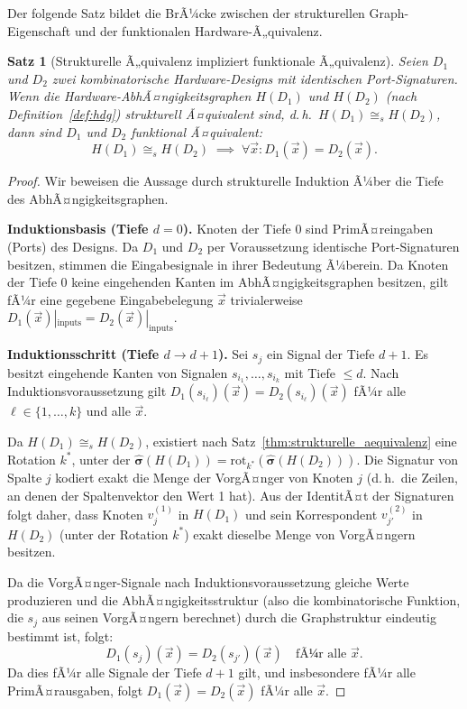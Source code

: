 ﻿\documentclass[12pt,a4paper]{report}
\newtheorem{theorem}{Satz}[section]
\begin{document}
Der folgende Satz bildet die BrÃ¼cke zwischen der strukturellen Graph-Eigenschaft und der funktionalen Hardware-Ã„quivalenz.

\begin{theorem}[Strukturelle Ã„quivalenz impliziert funktionale Ã„quivalenz]
\label{thm:struktur_impliziert_funktion}
Seien $D_1$ und $D_2$ zwei kombinatorische Hardware-Designs mit identischen Port-Signaturen. Wenn die Hardware-AbhÃ¤ngigkeitsgraphen $H(D_1)$ und $H(D_2)$ (nach Definition~\ref{def:hdg}) strukturell Ã¤qui\-valent sind, d.\,h.\ $H(D_1) \cong_s H(D_2)$, dann sind $D_1$ und $D_2$ funktional Ã¤quivalent:
\[
H(D_1) \cong_s H(D_2) \;\implies\; \forall \vec{x} : D_1(\vec{x}) = D_2(\vec{x}).
\]
\end{theorem}

\begin{proof}
Wir beweisen die Aussage durch strukturelle Induktion Ã¼ber die Tiefe des AbhÃ¤ngigkeitsgraphen.

\textbf{Induktionsbasis (Tiefe $d = 0$).}
Knoten der Tiefe 0 sind PrimÃ¤reingaben (Ports) des Designs. Da $D_1$ und $D_2$ per Voraussetzung identische Port-Signaturen besitzen, stimmen die Eingabesignale in ihrer Bedeutung Ã¼berein. Da Knoten der Tiefe 0 keine eingehenden Kanten im AbhÃ¤ngigkeitsgraphen besitzen, gilt fÃ¼r eine gegebene Eingabebelegung $\vec{x}$ trivialerweise $D_1(\vec{x})|_{\mathrm{inputs}} = D_2(\vec{x})|_{\mathrm{inputs}}$.

\textbf{Induktionsschritt (Tiefe $d \to d+1$).}
Sei $s_j$ ein Signal der Tiefe $d+1$. Es besitzt eingehende Kanten von Signalen $s_{i_1}, \ldots, s_{i_k}$ mit Tiefe $\leq d$. Nach Induktionsvoraussetzung gilt $D_1(s_{i_\ell})(\vec{x}) = D_2(s_{i_\ell})(\vec{x})$ fÃ¼r alle $\ell \in \{1,\ldots,k\}$ und alle $\vec{x}$.

Da $H(D_1) \cong_s H(D_2)$, existiert nach Satz~\ref{thm:strukturelle_aequivalenz} eine Rotation $k^*$, unter der $\hat{\boldsymbol{\sigma}}(H(D_1)) = \mathrm{rot}_{k^*}(\hat{\boldsymbol{\sigma}}(H(D_2)))$. Die Signatur von Spalte $j$ kodiert exakt die Menge der VorgÃ¤nger von Knoten $j$ (d.\,h.\ die Zeilen, an denen der Spaltenvektor den Wert 1 hat). Aus der IdentitÃ¤t der Signaturen folgt daher, dass Knoten $v_j^{(1)}$ in $H(D_1)$ und sein Korrespondent $v_{j'}^{(2)}$ in $H(D_2)$ (unter der Rotation $k^*$) exakt dieselbe Menge von VorgÃ¤ngern besitzen.

Da die VorgÃ¤nger-Signale nach Induktionsvoraussetzung gleiche Werte produzieren und die AbhÃ¤ngigkeitsstruktur (also die kombinatorische Funktion, die $s_j$ aus seinen VorgÃ¤ngern berechnet) durch die Graphstruktur eindeutig bestimmt ist, folgt:
\[
D_1(s_j)(\vec{x}) = D_2(s_{j'})(\vec{x}) \quad \text{fÃ¼r alle } \vec{x}.
\]
Da dies fÃ¼r alle Signale der Tiefe $d+1$ gilt, und insbesondere fÃ¼r alle PrimÃ¤rausgaben, folgt $D_1(\vec{x}) = D_2(\vec{x})$ fÃ¼r alle $\vec{x}$.
\end{proof}
\end{document}
